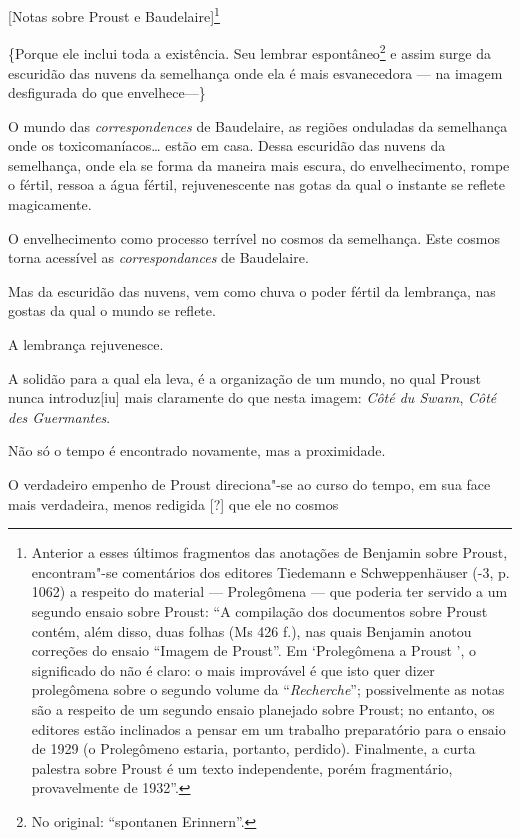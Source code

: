 {[}Notas sobre Proust e Baudelaire{]}\footnote{Anterior a esses
  últimos fragmentos das anotações de Benjamin sobre Proust,
  encontram"-se comentários dos editores Tiedemann e Schweppenhäuser
  (-3, p. 1062) a respeito do material --- Prolegômena ---
  que poderia ter servido a um segundo ensaio sobre Proust: ``A
  compilação dos documentos sobre Proust contém, além disso, duas folhas
  (Ms 426 f.), nas quais Benjamin anotou correções do ensaio
  ``Imagem de Proust''. Em `Prolegômena a Proust
  ', o significado do  não é claro: o mais improvável é que isto
  quer dizer prolegômena sobre o segundo volume da ``\emph{Recherche}'';
  possivelmente as notas são a respeito de um segundo ensaio planejado
  sobre Proust; no entanto, os editores estão inclinados a pensar em um
  trabalho preparatório para o ensaio de 1929 (o Prolegômeno  estaria,
  portanto, perdido). Finalmente, a curta palestra sobre Proust é um
  texto independente, porém fragmentário, provavelmente de 1932''. \versal{[N. E.]}}

\{Porque ele inclui toda a existência. Seu lembrar espontâneo\footnote{No original: ``spontanen Erinnern''. \versal{[N. T.]}} e assim surge da escuridão das
nuvens da semelhança onde ela é mais esvanecedora --- na imagem
desfigurada do que envelhece---\}

O mundo das \emph{correspondences} de Baudelaire, as regiões onduladas
da semelhança onde os toxicomaníacos\ldots{} estão em casa. Dessa escuridão
das nuvens da semelhança, onde ela se forma da maneira mais escura, do
envelhecimento, rompe o fértil, ressoa a água fértil, rejuvenescente nas
gotas da qual o instante se reflete magicamente.

O envelhecimento como processo terrível no cosmos da semelhança. Este
cosmos torna acessível as \emph{correspondances} de Baudelaire.

Mas da escuridão das nuvens, vem como chuva o poder fértil da lembrança,
nas gostas da qual o mundo se reflete.

A lembrança rejuvenesce.

A solidão para a qual ela leva, é a organização de um mundo, no qual
Proust nunca introduz{[}iu{]} mais claramente do que nesta imagem:
\emph{Côté du Swann}, \emph{Côté des Guermantes}.

Não só o tempo é encontrado novamente, mas a proximidade.

O verdadeiro empenho de Proust direciona"-se ao curso do tempo, em sua
face mais verdadeira, menos redigida {[}?{]} que ele no cosmos

